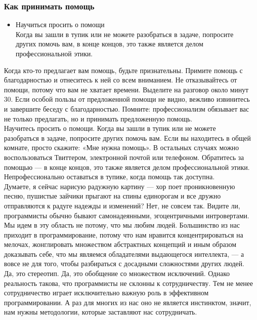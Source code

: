 \documentclass{../industrial-development}
\begin{document}
\begin{frame} \frametitle{Как принимать помощь}
\begin{itemize}
  \item Научиться просить о помощи\\
	Когда вы зашли в тупик или не можете разобраться в задаче, попросите других помочь вам, в конце концов, это также является делом профессиональной этики.
\end{itemize}
\end{frame}
\lecturenotes
Когда кто-то предлагает вам помощь, будьте признательны. Примите помощь с благодарностью и отнеситесь к ней со всем вниманием. Не отказывайтесь от помощи, потому что вам не хватает времени. Выделите на разговор около минут 30. Если особой пользы от предложенной помощи не видно, вежливо извинитесь и завершите беседу с благодарностью. Помните: профессионализм обязывает вас не только предлагать, но и принимать предложенную помощь.\\
Научитесь просить о помощи. Когда вы зашли в тупик или не можете разобраться в задаче, попросите других помочь вам. Если вы находитесь в общей комнате, просто скажите: «Мне нужна помощь». В остальных случаях можно воспользоваться Твиттером, электронной почтой или телефоном. Обратитесь за помощью — в конце концов, это также является делом профессиональной этики. Непрофессионально оставаться в тупике, когда помощь так доступна.\\
Думаете, я сейчас нарисую радужную картину — хор поет проникновенную песню, пушистые зайчики прыгают на спины единорогам и все дружно отправляются к радуге надежды и изменений? Нет, не совсем так. Видите ли, программисты обычно бывают самонадеянными, эгоцентричными интровертами. Мы идем в эту область не потому, что мы любим людей. Большинство из нас приходит в программирование, потому что нам нравится концентрироваться на мелочах, жонглировать множеством абстрактных концепций и иным образом доказывать себе, что мы являемся обладателями выдающегося интеллекта, — а вовсе не для того, чтобы разбираться с досадными сложностями других людей.\\
Да, это стереотип. Да, это обобщение со множеством исключений. Однако реальность такова, что программисты не склонны к сотрудничеству. Тем не менее сотрудничество играет исключительно важную
роль в эффективном программировании. А раз для многих из нас оно не является инстинктом, значит, нам нужны методологии, которые заставляют нас сотрудничать.
\end{document}
